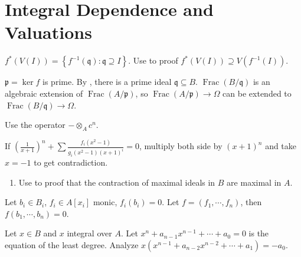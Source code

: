 \section{Integral Dependence and Valuations}

\begin{exercise}\label{ex5.1}
	$f^*(V(I))=\left\{f^{-1}(\mathfrak{q}):\mathfrak{q}\supseteq I\right\}$. Use  to proof $f^*(V(I))\supseteq V\left(f^{-1}(I)\right)$.
\end{exercise}

\begin{exercise}\label{ex5.2}
	$\mathfrak{p}=\ker f$ is prime. By , there is a prime ideal $\mathfrak{q}\subseteq B$. $\operatorname{Frac}(B/\mathfrak{q})$ is an algebraic extension of $\operatorname{Frac}(A/\mathfrak{p})$, so $\operatorname{Frac}(A/\mathfrak{p})\rightarrow\Omega$ can be extended to $\operatorname{Frac}(B/\mathfrak{q})\rightarrow\Omega$.
\end{exercise}

\begin{exercise}\label{ex5.3}
	Use the operator $-\otimes_A c^n$.
\end{exercise}

\begin{exercise}\label{ex5.4}
	If $\left(\frac{1}{x+1}\right)^n+\sum\frac{f_i\left(x^2-1\right)}{g_i\left(x^2-1\right)(x+1)^i}=0$, multiply both side by $(x+1)^n$ and take $x=-1$ to get contradiction.
\end{exercise}

\begin{exercise}\label{ex5.5}
	\begin{enumerate}
		\item[(ii)] Use  to proof that the contraction of maximal ideals in $B$ are maximal in $A$.
	\end{enumerate}
\end{exercise}

\begin{exercise}\label{ex5.6}
	Let $b_i\in B_i$, $f_i\in A\left[x_i\right]$ monic, $f_i(b_i)=0$. Let $f=\left(f_1,\cdots,f_n\right)$, then $f(b_1,\cdots,b_n)=0$.
\end{exercise}

\begin{exercise}\label{ex5.7}
	Let $x\in B$ and $x$ integral over $A$. Let $x^n+a_{n-1}x^{n-1}+\cdots+a_0=0$ is the equation of the least degree. Analyze $x\left(x^{n-1}+a_{n-2}x^{n-2}+\cdots+a_1\right)=-a_0$.
\end{exercise}

